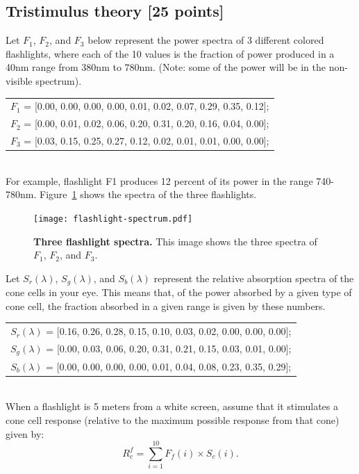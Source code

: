 \documentclass[10pt,letterpaper]{article}
\begin{document}
\subsection{Tristimulus theory [25 points]} Let $F_1$, $F_2$, and $F_3$ below
represent the power spectra of 3 different colored flashlights, where each of the 10 values is the fraction of power produced in a 40nm range from 380nm to 780nm. (Note: some of the power will be in the non-visible spectrum).\\

\begin{tabular}{c}
$F_1$ = [0.00, 0.00, 0.00, 0.00, 0.01, 0.02, 0.07, 0.29, 0.35, 0.12];\\
$F_2$ = [0.00, 0.01, 0.02, 0.06, 0.20, 0.31, 0.20, 0.16, 0.04, 0.00];\\
$F_3$ = [0.03, 0.15, 0.25, 0.27, 0.12, 0.02, 0.01, 0.01, 0.00, 0.00];\\
\end{tabular} \\

For example, flashlight F1 produces 12 percent of its power in the range 740-780nm. Figure~\ref{fig:spectra} shows the spectra of the three flashlights.\\

\begin{figure}[h]
\centering
\texttt{[image: flashlight-spectrum.pdf]}
\caption{\textbf{Three flashlight spectra.} This image shows the three spectra of $F_1$, $F_2$, and $F_3$.}
\label{fig:spectra}
\end{figure}

Let $S_r(\lambda)$, $S_g(\lambda)$, and $S_b(\lambda)$ represent the relative absorption spectra of the cone cells in your eye. This means that, of the power absorbed by a given type of cone cell, the fraction absorbed in a given range is given by these numbers.\\

\begin{tabular}{c}
$S_r(\lambda)$ = [0.16, 0.26, 0.28, 0.15, 0.10, 0.03, 0.02, 0.00, 0.00, 0.00]; \\
$S_g(\lambda)$ = [0.00, 0.03, 0.06, 0.20, 0.31, 0.21, 0.15, 0.03, 0.01, 0.00];\\
$S_b(\lambda)$ = [0.00, 0.00, 0.00, 0.00, 0.01, 0.04, 0.08, 0.23, 0.35, 0.29];
\end{tabular}\\

When a flashlight is 5 meters from a white screen, assume that it stimulates
a cone cell response (relative to the maximum possible response from that cone)
given by: \\
\begin{equation*}
R^f_c = \sum_{i=1}^{10} F_f (i) \times S_c(i).
\end{equation*}
\end{document}
